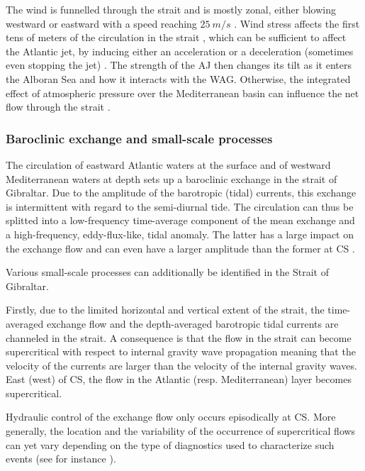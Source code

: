 The wind is funnelled through the strait and is mostly zonal, either blowing westward or eastward with a speed reaching $25\ m/s$ \citep{candela_1989}. Wind stress affects the first tens of meters of the circulation in the strait \citep{candela_1989}, which can be sufficient to affect the Atlantic jet, by inducing either an acceleration or a deceleration (sometimes even stopping the jet) \citep{lorente_2019}. The strength of the AJ then changes its tilt as it enters the Alboran Sea and how it interacts with the WAG. Otherwise, the integrated effect of atmospheric pressure over the Mediterranean basin can influence the net flow through the strait \citep{garcialafuente_2002}.



\subsubsection{Baroclinic exchange and small-scale processes}


The circulation of eastward Atlantic waters at the surface and of westward Mediterranean waters at depth sets up a baroclinic exchange in the strait of Gibraltar. Due to the amplitude of the barotropic (tidal) currents, this exchange is intermittent with regard to the semi-diurnal tide. The circulation can thus be splitted into a low-frequency time-average component of the mean exchange and a high-frequency, eddy-flux-like, tidal anomaly. The latter has a large impact on the exchange flow \citep{Naranjo2014} and can even have a larger amplitude than the former at CS \citep{vargas_2006}.

Various small-scale processes can additionally be identified in the Strait of Gibraltar.

Firstly, due to the limited horizontal and vertical extent of the strait, the time-averaged exchange flow and the depth-averaged barotropic tidal currents are channeled in the strait. A consequence is that the flow in the strait can become supercritical with respect to internal gravity wave propagation meaning that the velocity of the currents are larger than the velocity of the internal gravity waves.  East (west) of CS, the flow in the Atlantic (resp. Mediterranean) layer becomes supercritical.



Hydraulic control of the exchange flow only occurs episodically at CS. More generally, the location and the variability of the occurrence of supercritical flows can yet vary depending on the type of diagnostics used to characterize such events (see for instance \citet{FA1988,vargas_2006,sannino_2007,sanchez-roman_2012}). 

